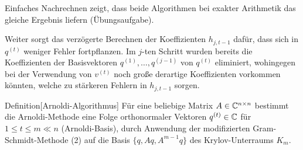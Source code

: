 
Einfaches Nachrechnen zeigt, dass beide Algorithmen bei exakter Arithmetik das
gleiche Ergebnis liefern (Übungsaufgabe).


Weiter sorgt das verzögerte Berechnen der Koeffizienten $h_{j,t-1}$ dafür, dass sich in $q^{(t)}$ weniger 
Fehler fortpflanzen. Im $j$-ten Schritt wurden bereits die Koeffizienten der Basisvektoren $q^{(1)},\dots,q^{(j-1)}$ 
von $q^{(t)}$ eliminiert, wohingegen bei der Verwendung von $v^{(t)}$ noch große derartige Koeffizienten
vorkommen könnten, welche zu stärkeren Fehlern in $h_{j,t-1}$ sorgen.

\begin{colbox}{Definition}[Arnoldi-Algorithmus] 
  Für eine beliebige Matrix $A\in\mathbb C^{n\times n}$ bestimmt die Arnoldi-Methode eine Folge orthonormaler 
  Vektoren $q^{(t)}\in\mathbb C  $ für $1\leq t \leq m \ll n$ (Arnoldi-Basis), durch Anwendung der modifizierten 
  Gram-Schmidt-Methode (2) auf die Basis $\{q,Aq,A^{m-1}q\}$ des Krylov-Unterraums $K_m$.
\end{colbox}

